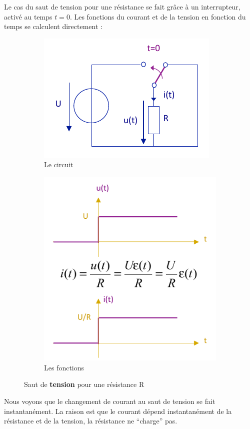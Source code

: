\documentclass[12pt,a4paper]{article}
\begin{document}
Le cas du saut de tension pour une résistance se fait grâce à un interrupteur, activé au temps $t=0$. Les fonctions du courant et de la tension en fonction du temps se calculent directement :
\begin{figure}[!h]
	\centering
	\begin{subfigure}[c]{0.45\textwidth}
		\includegraphics[scale=0.6]{images/saut_tension_R}
		\caption{Le circuit}
	\end{subfigure}
	\begin{subfigure}[c]{0.45\textwidth}
		\includegraphics[scale=0.6]{images/fonctions_saut_tension_R}
		\caption{Les fonctions}
	\end{subfigure}
	\caption{Saut de \textbf{tension} pour une résistance R}
\end{figure}

Nous voyons que le changement de courant au saut de tension se fait instantanément. La raison est que le courant dépend instantanément de la résistance et de la tension, la résistance ne ``charge'' pas. \\
\\
\end{document}
